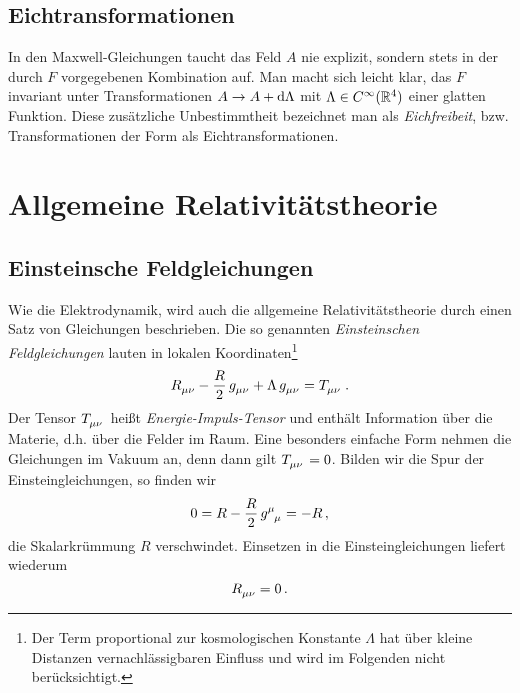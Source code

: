 \subsection{Eichtransformationen}
In den Maxwell-Gleichungen taucht das Feld $A$ nie explizit, sondern stets in
der durch $F$ vorgegebenen Kombination auf. Man macht sich leicht klar, das $F$
invariant unter Transformationen $A\to A+\dif\Lambda$ mit $\Lambda\in
C^\infty(\mathbb{R}^4)$ einer glatten Funktion. Diese zusätzliche Unbestimmtheit
bezeichnet man als \emph{Eichfreibeit}, bzw. Transformationen der Form als
Eichtransformationen. 
\section{Allgemeine Relativitätstheorie}
\subsection{Einsteinsche Feldgleichungen}
Wie die Elektrodynamik, wird auch die allgemeine Relativitätstheorie durch einen
Satz von Gleichungen beschrieben. Die so genannten \emph{Einsteinschen
Feldgleichungen} lauten in lokalen Koordinaten\footnote{Der Term proportional
zur kosmologischen Konstante $\Lambda$ hat über kleine Distanzen vernachlässigbaren Einfluss und wird im Folgenden nicht berücksichtigt.}
\begin{equation}
\tensor{R}{_\mu_\nu} - \frac{R}{2}\, \tensor{g}{_\mu_\nu}
+\Lambda\, \tensor{g}{_\mu_\nu}
=\tensor{T}{_\mu_\nu}\,.
\end{equation}
Der Tensor $\tensor{T}{_\mu_\nu}$ heißt \emph{Energie-Impuls-Tensor} und
enthält Information über die Materie, d.h. über die Felder im Raum. Eine
besonders einfache Form nehmen die Gleichungen im Vakuum an, denn dann gilt 
$\tensor{T}{_\mu_\nu}=0$.
Bilden wir die Spur der Einsteingleichungen, so finden wir 
\begin{equation}
0=R- \frac{R}{2}\, \tensor{g}{^\mu_\mu}= -R\,,
\end{equation}
die Skalarkrümmung $R$ verschwindet.
Einsetzen in die Einsteingleichungen liefert wiederum
\begin{equation}
\tensor{R}{_\mu_\nu}=0\,.
\end{equation}
